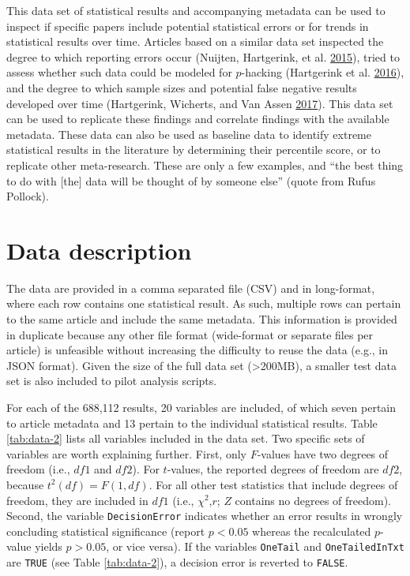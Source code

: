 \documentclass[a5paper]{book}
\begin{document}
This data set of statistical results and accompanying metadata can be
used to inspect if specific papers include potential statistical errors
or for trends in statistical results over time. Articles based on a
similar data set inspected the degree to which reporting errors occur
(Nuijten, Hartgerink, et al.
\protect\hyperlink{ref-doi:10.3758ux2fs13428-015-0664-2}{2015}), tried
to assess whether such data could be modeled for \(p\)-hacking
(Hartgerink et al.
\protect\hyperlink{ref-doi:10.7717ux2fpeerj.1935}{2016}), and the degree
to which sample sizes and potential false negative results developed
over time (Hartgerink, Wicherts, and Van Assen
\protect\hyperlink{ref-doi:10.1525ux2fcollabra.71}{2017}). This data set
can be used to replicate these findings and correlate findings with the
available metadata. These data can also be used as baseline data to
identify extreme statistical results in the literature by determining
their percentile score, or to replicate other meta-research. These are
only a few examples, and \enquote{the best thing to do with {[}the{]}
data will be thought of by someone else} (quote from Rufus Pollock).

\section{Data description}\label{data-description}

The data are provided in a comma separated file (CSV) and in
long-format, where each row contains one statistical result. As such,
multiple rows can pertain to the same article and include the same
metadata. This information is provided in duplicate because any other
file format (wide-format or separate files per article) is unfeasible
without increasing the difficulty to reuse the data (e.g., in JSON
format). Given the size of the full data set (\textgreater{}200MB), a
smaller test data set is also included to pilot analysis scripts.

For each of the 688,112 results, 20 variables are included, of which
seven pertain to article metadata and 13 pertain to the individual
statistical results. Table \ref{tab:data-2} lists all variables included
in the data set. Two specific sets of variables are worth explaining
further. First, only \(F\)-values have two degrees of freedom (i.e.,
\(df1\) and \(df2\)). For \(t\)-values, the reported degrees of freedom
are \(df2\), because \(t^2(df)=F(1,df)\). For all other test statistics
that include degrees of freedom, they are included in \(df1\) (i.e.,
\(\chi^2\),\(r\); \(Z\) contains no degrees of freedom). Second, the
variable \texttt{DecisionError} indicates whether an error results in
wrongly concluding statistical significance (report \(p<0.05\) whereas
the recalculated \(p\)-value yields \(p>0.05\), or vice versa). If the
variables \texttt{OneTail} and \texttt{OneTailedInTxt} are \texttt{TRUE}
(see Table \ref{tab:data-2}), a decision error is reverted to
\texttt{FALSE}.
\end{document}
